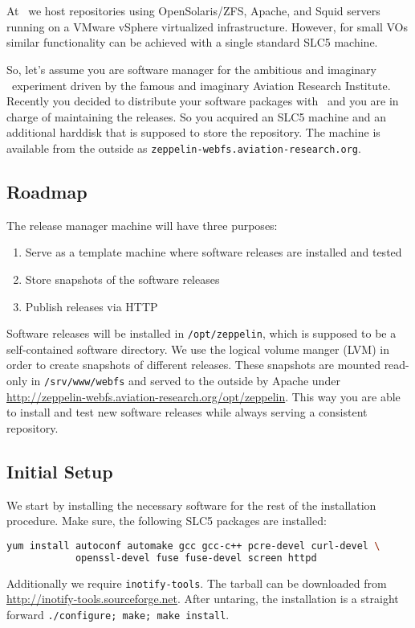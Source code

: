 \chapter{}
\label{apx:releasemgr}
At \cern\ we host repositories using OpenSolaris/ZFS, Apache, and Squid servers running on a VMware vSphere virtualized infrastructure.
However, for small VOs similar functionality can be achieved with a single standard SLC5 machine.

So, let's assume you are software manager for the ambitious and imaginary \zep\ experiment driven by the famous and imaginary Aviation Research Institute.
Recently you decided to distribute your software packages with \cvmfs\ and you are in charge of maintaining the releases.
So you acquired an SLC5 machine and an additional harddisk that is supposed to store the repository.
The machine is available from the outside as \texttt{zeppelin-webfs.aviation-research.org}.

\section{Roadmap}
The release manager machine will have three purposes:
\begin{enumerate}
	\item Serve as a template machine where software releases are installed and tested
	\item Store snapshots of the software releases
	\item Publish releases via HTTP
\end{enumerate}
Software releases will be installed in \texttt{/opt/zeppelin}, which is supposed to be a self-contained software directory.
We use the logical volume manger (LVM) in order to create snapshots of different releases.
These snapshots are mounted read-only in \texttt{/srv/www/webfs} and served to the outside by Apache under \url{http://zeppelin-webfs.aviation-research.org/opt/zeppelin}.
This way you are able to install and test new software releases while always serving a consistent repository.

\section{Initial Setup}
We start by installing the necessary software for the rest of the installation procedure.
Make sure, the following SLC5 packages are installed:
\begin{lstlisting}[language=bash]
yum install autoconf automake gcc gcc-c++ pcre-devel curl-devel \
            openssl-devel fuse fuse-devel screen httpd
\end{lstlisting}
Additionally we require \texttt{inotify-tools}.
The tarball can be downloaded from \url{http://inotify-tools.sourceforge.net}.
After untaring, the installation is a straight forward \lstinline{./configure; make; make install}.


